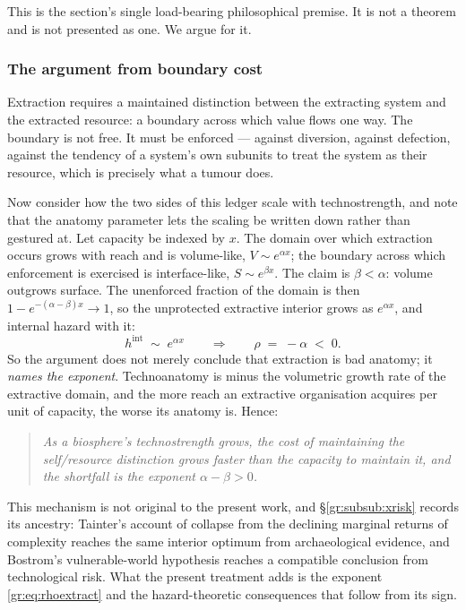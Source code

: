 \documentclass[11pt]{article}
\numberwithin{equation}{section}
\theoremstyle{plain}
\theoremstyle{definition}
\theoremstyle{remark}
\begin{document}
This is the section's single load-bearing philosophical premise. It is
not a theorem and is not presented as one. We argue for it.

\subsubsection{The argument from boundary cost}\label{gr:subsub:boundary}

Extraction requires a maintained distinction between the extracting
system and the extracted resource: a boundary across which value flows
one way. The boundary is not free. It must be enforced --- against
diversion, against defection, against the tendency of a system's own
subunits to treat the system as their resource, which is precisely what
a tumour does.

Now consider how the two sides of this ledger scale with technostrength,
and note that the anatomy parameter lets the scaling be written down
rather than gestured at. Let capacity be indexed by $x$. The domain over
which extraction occurs grows with reach and is volume-like,
$V\sim e^{\alpha x}$; the boundary across which enforcement is exercised
is interface-like, $S\sim e^{\beta x}$. The claim is
$\beta<\alpha$: volume outgrows surface. The unenforced fraction of the
domain is then $1-e^{-(\alpha-\beta)x}\to1$, so the unprotected
extractive interior grows as $e^{\alpha x}$, and internal hazard with
it:
\begin{equation}\label{gr:eq:rhoextract}
h^{\mathrm{int}}\;\sim\;e^{\alpha x}
\qquad\Longrightarrow\qquad
\rho\;=\;-\alpha\;<\;0 .
\end{equation}
So the argument does not merely conclude that extraction is bad
anatomy; it \emph{names the exponent}. Technoanatomy is minus the
volumetric growth rate of the extractive domain, and the more reach an
extractive organisation acquires per unit of capacity, the worse its
anatomy is. Hence:

\begin{quote}
\emph{As a biosphere's technostrength grows, the cost of maintaining the
self/resource distinction grows faster than the capacity to maintain
it, and the shortfall is the exponent $\alpha-\beta>0$.}
\end{quote}

\noindent This mechanism is not original to the present work, and
\S\ref{gr:subsub:xrisk} records its ancestry: Tainter's account of
collapse from the declining marginal returns of complexity
\cite{Tainter88} reaches the same interior optimum from archaeological
evidence, and Bostrom's vulnerable-world hypothesis \cite{Bostrom19}
reaches a compatible conclusion from technological risk. What the
present treatment adds is the exponent \eqref{gr:eq:rhoextract} and the
hazard-theoretic consequences that follow from its sign.
\end{document}
